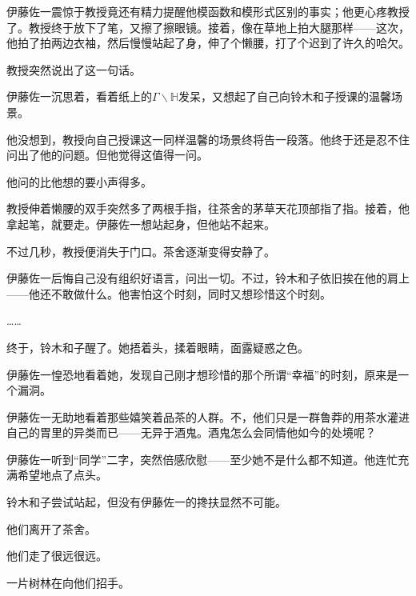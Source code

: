 伊藤佐一震惊于教授竟还有精力提醒他模函数和模形式区别的事实；他更心疼教授了。教授终于放下了笔，又擦了擦眼镜。接着，像在草地上拍大腿那样——这次，他拍了拍两边衣袖，然后慢慢站起了身，伸了个懒腰，打了个迟到了许久的哈欠。

教授突然说出了这一句话。

伊藤佐一沉思着，看着纸上的\(\Gamma\backslash\mathbb H\)发呆，又想起了自己向铃木和子授课的温馨场景。

他没想到，教授向自己授课这一同样温馨的场景终将告一段落。他终于还是忍不住问出了他的问题。但他觉得这值得一问。

他问的比他想的要小声得多。


教授伸着懒腰的双手突然多了两根手指，往茶舍的茅草天花顶部指了指。接着，他拿起笔，就要走。伊藤佐一想站起身，但他站不起来。

不过几秒，教授便消失于门口。茶舍逐渐变得安静了。

伊藤佐一后悔自己没有组织好语言，问出一切。不过，铃木和子依旧挨在他的肩上——他还不敢做什么。他害怕这个时刻，同时又想珍惜这个时刻。

……

终于，铃木和子醒了。她捂着头，揉着眼睛，面露疑惑之色。


伊藤佐一惶恐地看着她，发现自己刚才想珍惜的那个所谓“幸福”的时刻，原来是一个漏洞。


伊藤佐一无助地看着那些嬉笑着品茶的人群。不，他们只是一群鲁莽的用茶水灌进自己的胃里的异类而已——无异于酒鬼。酒鬼怎么会同情他如今的处境呢？


伊藤佐一听到“同学”二字，突然倍感欣慰——至少她不是什么都不知道。他连忙充满希望地点了点头。


铃木和子尝试站起，但没有伊藤佐一的搀扶显然不可能。

他们离开了茶舍。

他们走了很远很远。

一片树林在向他们招手。



